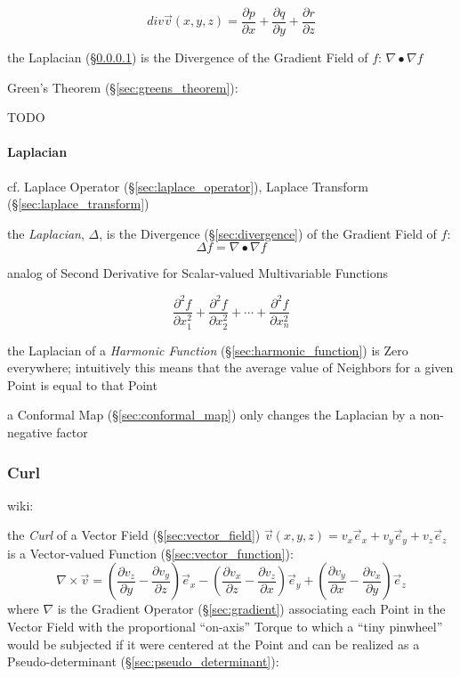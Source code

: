 \[
  div\vec{v}(x,y,z)
    = \frac{\partial{p}}{\partial{x}}
    + \frac{\partial{q}}{\partial{y}}
    + \frac{\partial{r}}{\partial{z}}
\]

the Laplacian (\S\ref{sec:laplacian}) is the Divergence of the Gradient Field
of $f$: $\nabla \bullet \nabla f$

Green's Theorem (\S\ref{sec:greens_theorem}):

TODO



\paragraph{Laplacian}\label{sec:laplacian}\hfill

\fist cf. Laplace Operator (\S\ref{sec:laplace_operator}), Laplace Transform
(\S\ref{sec:laplace_transform}) %

the \emph{Laplacian}, $\Delta$, is the Divergence (\S\ref{sec:divergence}) of
the Gradient Field of $f$:
\[
  \Delta f = \nabla \bullet \nabla f
\]

analog of Second Derivative for Scalar-valued Multivariable Functions

\[
  \frac{\partial^2 f}{\partial{x_1^2}} +
  \frac{\partial^2 f}{\partial{x_2^2}} +
  \cdots +
  \frac{\partial^2 f}{\partial{x_n^2}}
\]

the Laplacian of a \emph{Harmonic Function} (\S\ref{sec:harmonic_function}) is
Zero everywhere; intuitively this means that the average value of Neighbors for
a given Point is equal to that Point

a Conformal Map (\S\ref{sec:conformal_map}) only changes the Laplacian by a
non-negative factor



\subsubsection{Curl}\label{sec:curl}

wiki:

the \emph{Curl} of a Vector Field (\S\ref{sec:vector_field}) $\vec{v}(x,y,z) =
v_x\vec{e}_x + v_y\vec{e}_y + v_z\vec{e}_z$ is a Vector-valued Function
(\S\ref{sec:vector_function}):
\[
  \nabla\times\vec{v} =
    (\frac{\partial v_z}{\partial y}-\frac{\partial v_y}{\partial z})\vec{e}_x -
    (\frac{\partial v_x}{\partial z}-\frac{\partial v_z}{\partial x})\vec{e}_y +
    (\frac{\partial v_y}{\partial x}-\frac{\partial v_x}{\partial y})\vec{e}_z
\]
where $\nabla$ is the Gradient Operator (\S\ref{sec:gradient}) associating each
Point in the Vector Field with the proportional ``on-axis'' Torque to which a
``tiny pinwheel'' would be subjected if it were centered at the Point and can
be realized as a Pseudo-determinant (\S\ref{sec:pseudo_determinant}):

